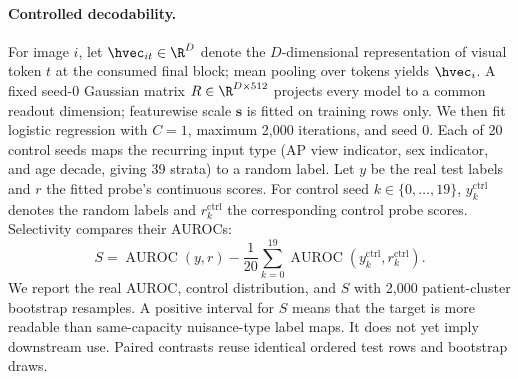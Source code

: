 \paragraph{Controlled decodability.}
For image $i$, let $\hvec_{it}\in\R^D$ denote the $D$-dimensional representation of visual token $t$ at the consumed final block; mean pooling over tokens yields $\hvec_i$. A fixed seed-0 Gaussian matrix $R\in\R^{D\times512}$ projects every model to a common readout dimension; featurewise scale $\boldsymbol{s}$ is fitted on training rows only. We then fit logistic regression with $C=1$, maximum 2,000 iterations, and seed 0. Each of 20 control seeds maps the recurring input type (AP view indicator, sex indicator, and age decade, giving 39 strata) to a random label. Let $y$ be the real test labels and $r$ the fitted probe's continuous scores. For control seed $k\in\{0,\ldots,19\}$, $y_k^{\mathrm{ctrl}}$ denotes the random labels and $r_k^{\mathrm{ctrl}}$ the corresponding control probe scores. Selectivity compares their AUROCs:
\begin{equation}
S = \operatorname{AUROC}(y,r)-\frac{1}{20}\sum_{k=0}^{19}\operatorname{AUROC}(y_k^{\mathrm{ctrl}},r_k^{\mathrm{ctrl}}).
\label{eq:seed-selectivity}
\end{equation}
We report the real AUROC, control distribution, and $S$ with 2,000 patient-cluster bootstrap resamples. A positive interval for $S$ means that the target is more readable than same-capacity nuisance-type label maps. It does not yet imply downstream use. Paired contrasts reuse identical ordered test rows and bootstrap draws.


